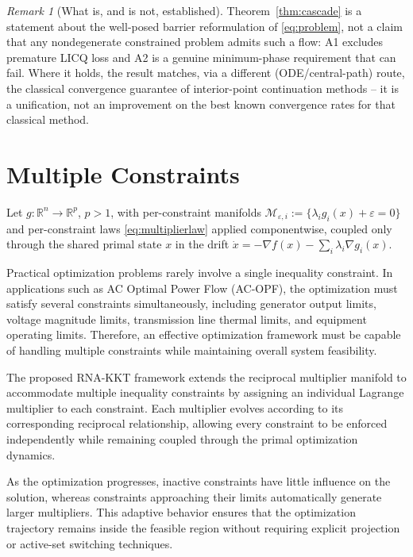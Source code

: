 \documentclass[11pt,onecolumn]{article}
\theoremstyle{definition}
\theoremstyle{remark}
\newtheorem{remark}[theorem]{Remark}
\newcommand{\Rn}{\mathbb{R}^n}
\newcommand{\Rp}{\mathbb{R}^p}
\begin{document}
\begin{remark}[What is, and is not, established]
Theorem~\ref{thm:cascade} is a statement about the well-posed barrier reformulation of
\eqref{eq:problem}, not a claim that any nondegenerate constrained problem admits such a flow: A1
excludes premature LICQ loss and A2 is a genuine minimum-phase requirement that can fail. Where
it holds, the result matches, via a different (ODE/central-path) route, the classical
convergence guarantee of interior-point continuation methods -- it is a unification, not an
improvement on the best known convergence rates for that classical method.
\end{remark}

\section{Multiple Constraints} \label{sec:multiple}

Let $g : \Rn \to \Rp$, $p > 1$, with per-constraint manifolds
$\mathcal{M}_{\varepsilon,i} := \{\lambda_i g_i(x) + \varepsilon = 0\}$ and per-constraint laws
\eqref{eq:multiplierlaw} applied componentwise, coupled only through the shared primal state
$x$ in the drift $\dot x = -\nabla f(x) - \sum_i \lambda_i \nabla g_i(x)$.


Practical optimization problems rarely involve a single inequality constraint. In applications such as AC Optimal Power Flow (AC-OPF), the optimization must satisfy several constraints simultaneously, including generator output limits, voltage magnitude limits, transmission line thermal limits, and equipment operating limits. Therefore, an effective optimization framework must be capable of handling multiple constraints while maintaining overall system feasibility.

The proposed RNA-KKT framework extends the reciprocal multiplier manifold to accommodate multiple inequality constraints by assigning an individual Lagrange multiplier to each constraint. Each multiplier evolves according to its corresponding reciprocal relationship, allowing every constraint to be enforced independently while remaining coupled through the primal optimization dynamics.

As the optimization progresses, inactive constraints have little influence on the solution, whereas constraints approaching their limits automatically generate larger multipliers. This adaptive behavior ensures that the optimization trajectory remains inside the feasible region without requiring explicit projection or active-set switching techniques.
\end{document}

